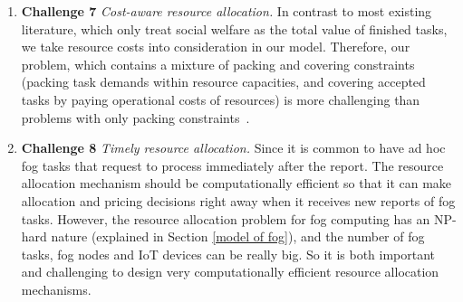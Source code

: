 \documentclass[11pt]{phdthesis}
\begin{document}
\begin{enumerate}
	\item \label{itm: Challenge cost-aware} \textbf{Challenge 7} \textit{Cost-aware resource allocation.} In contrast to most existing literature, which only treat social welfare as the total value of finished tasks, we take resource costs into consideration in our model. Therefore, our problem, which contains a mixture of packing and covering constraints (packing task demands within resource capacities, and covering accepted tasks by paying operational costs of resources)  is more challenging than problems with only packing constraints~\citep{azar2013online}.
	
	\item \label{itm: Challenge scalability} \textbf{Challenge 8}
	\textit{Timely resource allocation.} Since it is common to have ad hoc fog tasks that request to process immediately after the report. The resource allocation mechanism should be computationally efficient so that it can make allocation and pricing decisions right away when it receives new reports of fog tasks. However, the resource allocation problem for fog computing has an NP-hard nature (explained in Section \ref{model of fog}), and the number of fog tasks, fog nodes and IoT devices can be really big. So it is both important and challenging to design very computationally efficient resource allocation mechanisms. 
	
	
	
	
	

\end{enumerate}
\end{document}
